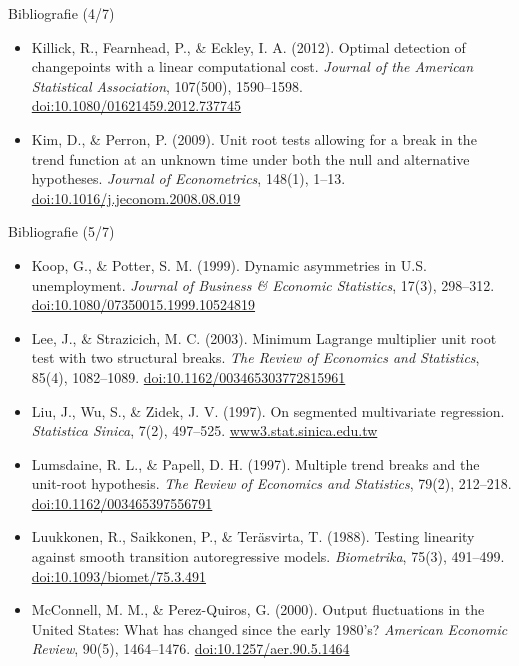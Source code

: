 \begin{frame}{Bibliografie (4/7)}
\begin{itemize}
    \item Killick, R., Fearnhead, P., \& Eckley, I. A. (2012). Optimal detection of changepoints with a linear computational cost. \textit{Journal of the American Statistical Association}, 107(500), 1590--1598. \href{https://doi.org/10.1080/01621459.2012.737745}{doi:10.1080/01621459.2012.737745}
    \item Kim, D., \& Perron, P. (2009). Unit root tests allowing for a break in the trend function at an unknown time under both the null and alternative hypotheses. \textit{Journal of Econometrics}, 148(1), 1--13. \href{https://doi.org/10.1016/j.jeconom.2008.08.019}{doi:10.1016/j.jeconom.2008.08.019}
\end{itemize}
\end{frame}

\begin{frame}{Bibliografie (5/7)}
\itemsize{\tiny}
\begin{itemize}
    \item Koop, G., \& Potter, S. M. (1999). Dynamic asymmetries in U.S. unemployment. \textit{Journal of Business \& Economic Statistics}, 17(3), 298--312. \href{https://doi.org/10.1080/07350015.1999.10524819}{doi:10.1080/07350015.1999.10524819}
    \item Lee, J., \& Strazicich, M. C. (2003). Minimum Lagrange multiplier unit root test with two structural breaks. \textit{The Review of Economics and Statistics}, 85(4), 1082--1089. \href{https://doi.org/10.1162/003465303772815961}{doi:10.1162/003465303772815961}
    \item Liu, J., Wu, S., \& Zidek, J. V. (1997). On segmented multivariate regression. \textit{Statistica Sinica}, 7(2), 497--525. \href{https://www3.stat.sinica.edu.tw/statistica/j7n2/j7n213/j7n213.htm}{www3.stat.sinica.edu.tw}
    \item Lumsdaine, R. L., \& Papell, D. H. (1997). Multiple trend breaks and the unit-root hypothesis. \textit{The Review of Economics and Statistics}, 79(2), 212--218. \href{https://doi.org/10.1162/003465397556791}{doi:10.1162/003465397556791}
    \item Luukkonen, R., Saikkonen, P., \& Teräsvirta, T. (1988). Testing linearity against smooth transition autoregressive models. \textit{Biometrika}, 75(3), 491--499. \href{https://doi.org/10.1093/biomet/75.3.491}{doi:10.1093/biomet/75.3.491}
    \item McConnell, M. M., \& Perez-Quiros, G. (2000). Output fluctuations in the United States: What has changed since the early 1980's? \textit{American Economic Review}, 90(5), 1464--1476. \href{https://doi.org/10.1257/aer.90.5.1464}{doi:10.1257/aer.90.5.1464}

\end{itemize}
\end{frame}

